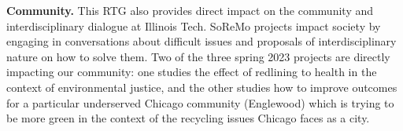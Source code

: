 \documentclass[11pt]{NSFamsart}
\begin{document}
{{\bf Community.} 
This RTG also provides direct impact  on the community and interdisciplinary dialogue at Illinois Tech. 
SoReMo projects impact society by engaging in conversations about difficult issues and proposals of interdisciplinary nature on how to solve them. 
Two of the three spring 2023 projects are directly impacting our community: one studies the effect of redlining to health in the context of environmental justice, and the other studies how to improve outcomes for a particular underserved Chicago community (Englewood) which is trying to be more green in the context of the recycling issues Chicago faces as a city.  %
 
}
\end{document}
